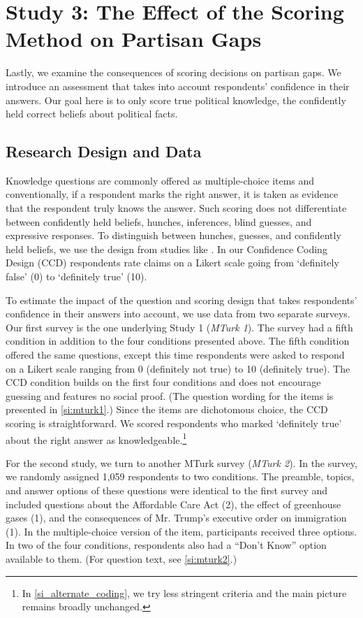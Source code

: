 \documentclass[12pt, letterpaper]{article}
\begin{document}
\section*{Study 3: The Effect of the Scoring Method on Partisan Gaps} \label{sec:confidence_coding}

Lastly, we examine the consequences of scoring decisions on partisan gaps. We introduce an assessment that takes into account respondents' confidence in their answers. Our goal here is to only score true political knowledge, the confidently held correct beliefs about political facts. 

\subsection*{Research Design and Data}\label{sec:data3}

Knowledge questions are commonly offered as multiple-choice items and conventionally, if a respondent marks the right answer, it is taken as evidence that the respondent truly knows the answer. Such scoring does not differentiate between confidently held beliefs, hunches, inferences, blind guesses, and expressive responses. To distinguish between hunches, guesses, and confidently held beliefs, we use the design from studies like \citet{pasek2015}. In our Confidence Coding Design (CCD) respondents rate claims on a Likert scale going from `definitely false' (0) to `definitely true' (10). 

To estimate the impact of the question and scoring design that takes respondents' confidence in their answers into account, we use data from two separate surveys. Our first survey is the one underlying Study 1 (\emph{MTurk 1}). The survey had a fifth condition in addition to the four conditions presented above. The fifth condition offered the same questions, except this time respondents were asked to respond on a Likert scale ranging from 0 (definitely not true) to 10 (definitely true). The CCD condition builds on the first four conditions and does not encourage guessing and features no social proof. (The question wording for the items is presented in \cref{si:mturk1}.) Since the items are dichotomous choice, the CCD scoring is straightforward. We scored respondents who marked `definitely true' about the right answer as knowledgeable.\footnote{In \cref{si_alternate_coding}, we try less stringent criteria and the main picture remains broadly unchanged.}

For the second study, we turn to another MTurk survey (\emph{MTurk 2}). In the survey, we randomly assigned 1,059 respondents to two conditions. The preamble, topics, and answer options of these questions were identical to the first survey and included questions about the Affordable Care Act (2), the effect of greenhouse gases (1), and the consequences of Mr. Trump's executive order on immigration (1). In the multiple-choice version of the item, participants received three options. In two of the four conditions, respondents also had a ``Don't Know'' option available to them. (For question text, see \cref{si:mturk2}.)
\end{document}
